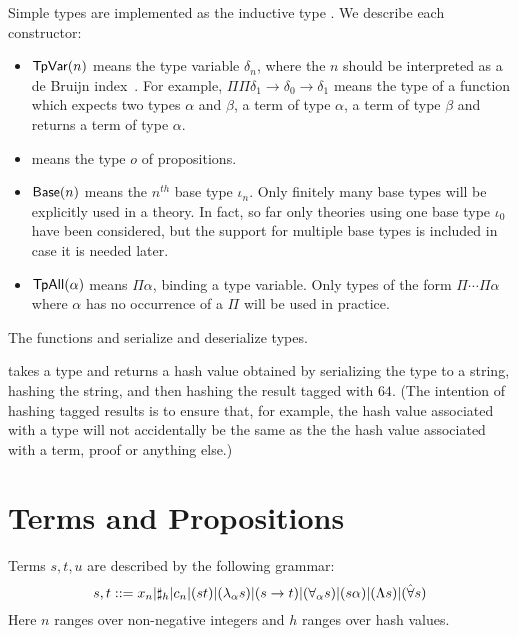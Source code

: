 Simple types are implemented as the inductive type {}.
We describe each constructor:
\begin{itemize}
\item ${\mbox{\constr{TpVar}}}(n)$ means the type variable $\delta_n$, where
the $n$ should be interpreted as a de Bruijn index~\cite{deBruijn72}.
For example, $\Pi \Pi \delta_1 \to \delta_0 \to \delta_1$
means the type
of a function which expects two types $\alpha$ and $\beta$,
a term of type $\alpha$, a term of type $\beta$
and returns a term of type $\alpha$.
\item {} means the type $o$ of propositions.
\item ${\mbox{\constr{Base}}}(n)$ means the $n^{th}$ base type $\iota_n$. Only finitely many base types will be explicitly used in
a theory. In fact, so far only theories using one base type
$\iota_0$ have been considered, but the support for multiple
base types is included in case it is needed later.
\item ${\mbox{\constr{TpAll}}}(\alpha)$ means $\Pi \alpha$, binding a type variable. Only types of the form $\Pi\cdots\Pi\alpha$
where $\alpha$ has no occurrence of a $\Pi$ will be used in practice.
\end{itemize}

The functions {} and {} serialize and deserialize types.

{} takes a type and returns a hash value obtained by serializing the type
to a string, hashing the string, and then hashing the result tagged with $64$.
(The intention of hashing tagged results is to ensure that, for example, the hash value
associated with a type will not accidentally be the same as the the hash value associated
with a term, proof or anything else.)

\section{Terms and Propositions}

Terms $s,t,u$ are described by the following grammar:
$$
s,t ::=  x_n |\mathbf{\sharp}_{h}|c_n|(st)|(\lambda_\alpha s)|(s\to t)|(\forall_\alpha s)|(s \alpha)|(\Lambda s)|(\hat{\forall} s)
$$
Here $n$ ranges over non-negative integers
and $h$ ranges over hash values.

